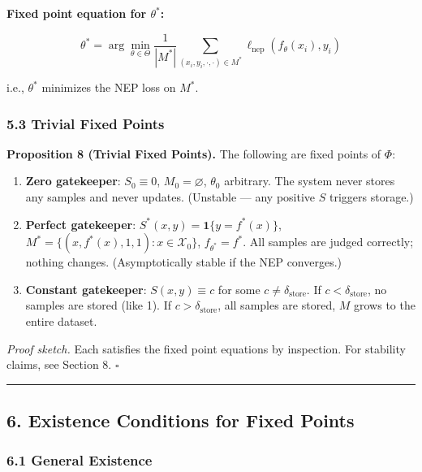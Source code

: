 \documentclass[
  12pt,
]{ctexart}
\begin{document}
\textbf{Fixed point equation for \(\theta^*\):}

\[\theta^* = \arg\min_{\theta \in \Theta} \frac{1}{|M^*|} \sum_{(x_i, y_i, \cdot, \cdot) \in M^*} \ell_{\text{nep}}(f_\theta(x_i), y_i)\]

i.e., \(\theta^*\) minimizes the NEP loss on \(M^*\).

\subsubsection{5.3 Trivial Fixed Points}\label{trivial-fixed-points}

\textbf{Proposition 8 (Trivial Fixed Points).} The following are fixed
points of \(\Phi\):

\begin{enumerate}
\def\labelenumi{\arabic{enumi}.}
\item
  \textbf{Zero gatekeeper}: \(S_0 \equiv 0\), \(M_0 = \varnothing\),
  \(\theta_0\) arbitrary. The system never stores any samples and never
  updates. (Unstable --- any positive \(S\) triggers storage.)
\item
  \textbf{Perfect gatekeeper}: \(S^*(x, y) = \mathbf{1}\{y = f^*(x)\}\),
  \(M^* = \{(x, f^*(x), 1, 1) : x \in \mathcal{X}_0\}\),
  \(f_{\theta^*} = f^*\). All samples are judged correctly; nothing
  changes. (Asymptotically stable if the NEP converges.)
\item
  \textbf{Constant gatekeeper}: \(S(x, y) \equiv c\) for some
  \(c \neq \delta_{\text{store}}\). If \(c < \delta_{\text{store}}\), no
  samples are stored (like 1). If \(c > \delta_{\text{store}}\), all
  samples are stored, \(M\) grows to the entire dataset.
\end{enumerate}

\emph{Proof sketch.} Each satisfies the fixed point equations by
inspection. For stability claims, see Section 8. \(\square\)

\begin{center}\rule{0.5\linewidth}{0.5pt}\end{center}

\subsection{6. Existence Conditions for Fixed
Points}\label{existence-conditions-for-fixed-points}

\subsubsection{6.1 General Existence}\label{general-existence}
\end{document}
